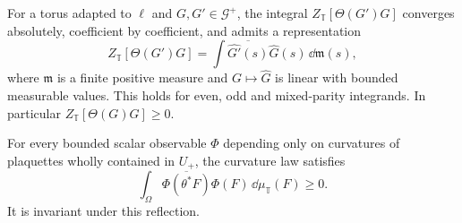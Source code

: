 \begin{proposition}\label{thm:reg-adapted-positivity}
For a torus adapted to $\ell$ and $G,G'\in\mathcal G^+$, the integral
$Z_{\mathbb T}[\Theta(G')G]$ converges absolutely, coefficient by
coefficient, and admits a representation
\begin{equation}\label{eq:reg-positive-representation}
 Z_{\mathbb T}[\Theta(G')G]
   =\int\overline{\widehat{G'}(s)}\widehat G(s)\,\dd\mathfrak m(s),
\end{equation}
where $\mathfrak m$ is a finite positive measure and
$G\mapsto\widehat G$ is linear with bounded measurable values.
This holds for even, odd and mixed-parity integrands. In particular
$Z_{\mathbb T}[\Theta(G)G]\ge0$.

For every bounded scalar observable $\Phi$ depending only on curvatures
of plaquettes wholly contained in $U_+$, the curvature law satisfies
\begin{equation}\label{eq:reg-law-positivity}
 \int_\Omega\overline{\Phi(\theta^*F)}\Phi(F)\,\dd\mu_{\mathbb T}(F)
 \ge0.
\end{equation}
It is invariant under this reflection.
\end{proposition}

